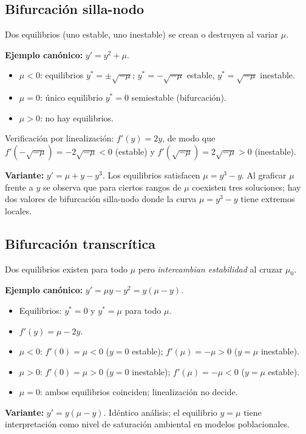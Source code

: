 \documentclass[11pt,letterpaper]{article}
\begin{document}
\subsection{Bifurcación silla-nodo}

Dos equilibrios (uno estable, uno inestable) se crean o destruyen al variar $\mu$.

\textbf{Ejemplo canónico:} $y'=y^2+\mu$.
\begin{itemize}
    \item $\mu<0$: equilibrios $y^*=\pm\sqrt{-\mu}$; $y^*=-\sqrt{-\mu}$ estable, $y^*=\sqrt{-\mu}$ inestable.
    \item $\mu=0$: único equilibrio $y^*=0$ semiestable (bifurcación).
    \item $\mu>0$: no hay equilibrios.
\end{itemize}
Verificación por linealización: $f'(y)=2y$, de modo que
$f'(-\sqrt{-\mu})=-2\sqrt{-\mu}<0$ (estable) y $f'(\sqrt{-\mu})=2\sqrt{-\mu}>0$ (inestable).

\textbf{Variante:} $y'=\mu+y-y^3$.
Los equilibrios satisfacen $\mu=y^3-y$. Al graficar $\mu$ frente a $y$
se observa que para ciertos rangos de $\mu$ coexisten tres soluciones;
hay dos valores de bifurcación silla-nodo donde la curva $\mu=y^3-y$
tiene extremos locales.

\subsection{Bifurcación transcrítica}

Dos equilibrios existen para todo $\mu$ pero \emph{intercambian estabilidad}
al cruzar $\mu_0$.

\textbf{Ejemplo canónico:} $y'=\mu y-y^2=y(\mu-y)$.
\begin{itemize}
    \item Equilibrios: $y^*=0$ y $y^*=\mu$ para todo $\mu$.
    \item $f'(y)=\mu-2y$.
    \item $\mu<0$: $f'(0)=\mu<0$ ($y=0$ estable); $f'(\mu)=-\mu>0$ ($y=\mu$ inestable).
    \item $\mu>0$: $f'(0)=\mu>0$ ($y=0$ inestable); $f'(\mu)=-\mu<0$ ($y=\mu$ estable).
    \item $\mu=0$: ambos equilibrios coinciden; linealización no decide.
\end{itemize}

\textbf{Variante:} $y'=y(\mu-y)$. Idéntico análisis; el equilibrio $y=\mu$
tiene interpretación como nivel de saturación ambiental en modelos poblacionales.
\end{document}
